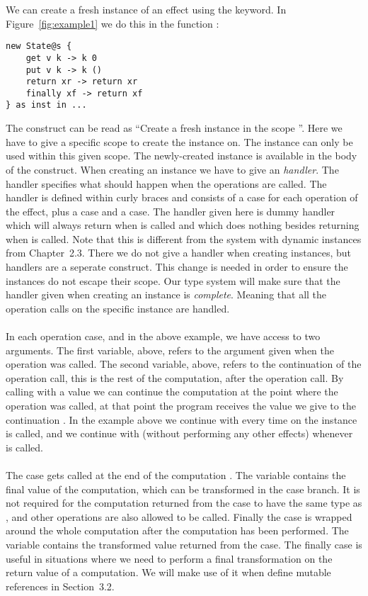 We can create a fresh instance of an effect using the  keyword.
In Figure~\ref{fig:example1} we do this in the function :
\begin{verbatim}
new State@s {
	get v k -> k 0
	put v k -> k ()
	return xr -> return xr
	finally xf -> return xf
} as inst in ...
\end{verbatim}
The construct  can be read as ``Create a fresh  instance in the scope ''.
Here we have to give a specific scope  to create the instance on.
The instance can only be used within this given scope.
The newly-created instance is available in the body of the  construct.
When creating an instance we have to give an \emph{handler}.
The handler specifies what should happen when the operations are called.
The handler is defined within curly braces and consists of a case for each operation of the effect, plus a  case and a  case.
The handler given here is dummy handler which will always return  when  is called and which does nothing besides returning \ident{()} when  is called.
Note that this is different from the system with dynamic instances from Chapter~2.3.
There we do not give a handler when creating instances, but handlers are a seperate construct.
This change is needed in order to ensure the instances do not escape their scope.
Our type system will make sure that the handler given when creating an instance is \emph{complete}.
Meaning that all the operation calls on the specific instance are handled.
\\\\
In each operation case,  and  in the above example, we have access to two arguments.
The first variable,  above, refers to the argument given when the operation was called.
The second variable,  above, refers to the continuation of the operation call, this is the rest of the computation, after the operation call.
By calling  with a value we can continue the computation at the point where the operation was called, at that point the program receives the value we give to the continuation .
In the example above we continue with  every time  on the instance  is called, and we continue with \ident{()} (without performing any other effects) whenever  is called.
\\\\
The  case gets called at the end of the computation .
The variable  contains the final value of the computation, which can be transformed in the case branch.
It is not required for the computation returned from the case to have the same type as , and other operations are also allowed to be called.
Finally the  case is wrapped around the whole computation  after the  computation has been performed.
The variable  contains the transformed value returned from the  case.
The finally case is useful in situations where we need to perform a final transformation on the return value of a computation.
We will make use of it when define mutable references in Section~3.2.

